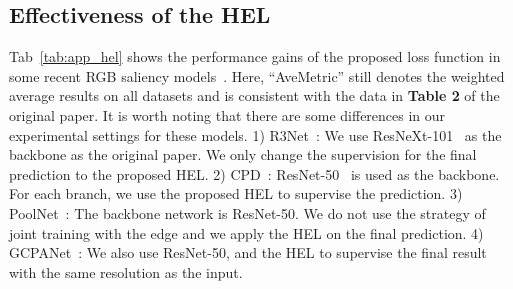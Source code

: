 \documentclass[runningheads]{llncs}
\begin{document}
\subsection{Effectiveness of the HEL}\label{sec:app_hel}

Tab~\ref{tab:app_hel} shows the performance gains of the proposed loss function in some recent RGB saliency models~\cite{R3Net,CPD,PoolNet,GCPANet}. Here, ``AveMetric'' still denotes the weighted average results on all datasets and is consistent with the data in \textbf{Table 2} of the original paper.
It is worth noting that there are some differences in our experimental settings for these models. 1) R3Net~\cite{R3Net}: We use ResNeXt-101~\cite{ResNext} as the backbone as the original paper. We only change the supervision for the final prediction to the proposed HEL. 2) CPD~\cite{CPD}: ResNet-50~\cite{Resnet} is used as the backbone. For each branch, we use the proposed HEL to supervise the prediction. 3) PoolNet~\cite{PoolNet}: The backbone network is ResNet-50. We do not use the strategy of joint training with the edge and we apply the HEL on the final prediction. 4) GCPANet~\cite{GCPANet}: We also use ResNet-50, and the HEL to supervise the final result with the same resolution as the input.
\end{document}
